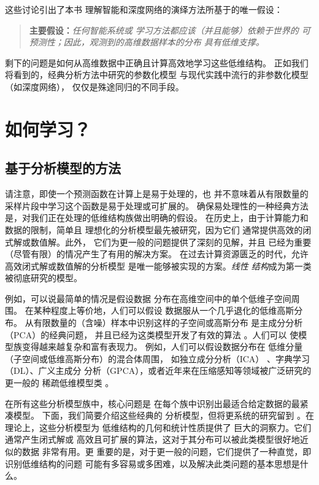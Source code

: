 \documentclass[../../book-main_zh.tex]{subfiles}
\begin{document}
这些讨论引出了本书
理解智能和深度网络的演绎方法所基于的唯一假设：
\begin{quote}
    \textbf{主要假设：}\textit{任何智能系统或
        学习方法都应该（并且能够）依赖于世界的
        可预测性；因此，观测到的高维数据样本的分布
    具有低维支撑。}
\end{quote}
剩下的问题是如何从高维数据中正确且计算高效地学习这些低维结构。
正如我们将看到的，经典分析方法中研究的参数化模型
与现代实践中流行的非参数化模型（如深度网络），
仅仅是殊途同归的不同手段。

\section{如何学习？}

\subsection{基于分析模型的方法}
\label{sec:analytical}
请注意，即使一个预测函数在计算上是易于处理的，也
并不意味着从有限数量的采样片段中学习这个函数是易于处理或可扩展的。
确保易处理性的一种经典方法是，对我们正在处理的低维结构族做出明确的假设。
在历史上，由于计算能力和数据的限制，简单且
理想化的分析模型最先被研究，因为它们
通常提供高效的闭式解或数值解。此外，
它们为更一般的问题提供了深刻的见解，并且
已经为重要（尽管有限）的情况产生了有用的解决方案。
在过去计算资源匮乏的时代，允许高效闭式解或数值解的分析模型
是唯一能够被实现的方案。\textit{线性
结构}成为第一类被彻底研究的模型。

例如，可以说最简单的情况是假设数据
分布在高维空间中的单个低维子空间周围。
在某种程度上等价地，人们可以假设
数据服从一个几乎退化的低维高斯分布。
从有限数量的（含噪）样本中识别这样的子空间或高斯分布
是主成分分析（PCA）的经典问题，
并且已经为这类模型开发了有效的算法 \cite{JolliffeI2002}。人们可以
使模型族变得越来越复杂和富有表现力。
例如，人们可以假设数据分布在
低维分量（子空间或低维高斯分布）的混合体周围，
如独立成分分析（ICA）
\cite{Ans-1985}、字典学习（DL）、广义主成分
分析（GPCA）\cite{Vidal-GPCA}，或者近年来在压缩感知等领域被广泛研究的更一般的
稀疏低维模型类
\cite{Wright-Ma-2022}。

在所有这些分析模型族中，核心问题是
在每个族中识别出最适合给定数据的最紧凑模型。
下面，我们简要介绍这些经典的
分析模型，但将更系统的研究留到
。在理论上，这些分析模型为
低维结构的几何和统计性质提供了
巨大的洞察力。它们通常产生闭式解或
高效且可扩展的算法，这对于其分布可以被此类模型很好地近似的数据
非常有用。更
重要的是，对于更一般的问题，它们提供了一种直觉，即识别低维结构的问题
可能有多容易或多困难，以及解决此类问题的基本思想是什么。
\end{document}
